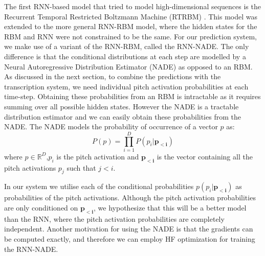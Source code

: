 	The first RNN-based model that tried to model high-dimensional sequences is the Recurrent Temporal Restricted Boltzmann Machine (RTRBM) \cite{sutskever2008recurrent}. This model was extended to the more general RNN-RBM model, where the hidden states for the RBM and RNN were not constrained to be the same. For our prediction system, we make use of a variant of the RNN-RBM, called the RNN-NADE. The only difference is that the conditional distributions at each step are modelled by a Neural Autoregressive Distribution Estimator (NADE) \cite{Larochelle2011} as opposed to an RBM. As discussed in the next section, to combine the predictions with the transcription system, we need individual pitch activation probabilities at each time-step. Obtaining these probabilities from an RBM is intractable as it requires summing over all possible hidden states. However the NADE is a tractable distribution estimator and we can easily obtain these probabilities from the NADE. The NADE models the probability of occurrence of a 
vector $p$ as: 
	\begin{equation}
		P(p) = \prod_{i=1}^D P(p_i|\mathbf{p_{<i}})
	\end{equation}
	where $ p \in \mathbb{R}^{D}$,$p_{i}$ is the pitch activation and $\mathbf{p_{<i}}$ is the vector containing all the pitch activations $p_j$ such that $j<i$. 
	
	In our system we utilise each of the conditional probabilities $p(p_i|\mathbf{p_{<i}})$ as probabilities of the pitch activations. Although the pitch activation probabilities are only conditioned on $\mathbf{p_{<i}}$, we hypothesize that this will be a better model than the RNN, where the pitch activation probabilities are completely independent. Another motivation for using the NADE is that the gradients can be computed exactly, and therefore we can employ HF optimization for training the RNN-NADE. 

